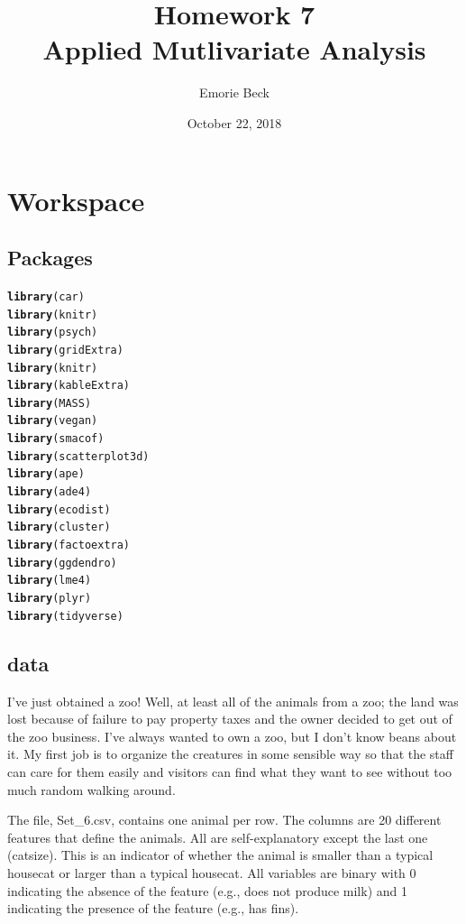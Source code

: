 \documentclass{article}\usepackage[]{graphicx}\usepackage[]{color}
\title{%
Homework 7\\
\large Applied Mutlivariate Analysis}
\date{October 22, 2018}
\author{Emorie Beck}
\makeatletter
\newcommand{\hlstd}[1]{\textcolor[rgb]{0.345,0.345,0.345}{#1}}%
\newcommand{\hlkwd}[1]{\textcolor[rgb]{0.737,0.353,0.396}{\textbf{#1}}}%
\newenvironment{kframe}{%
 \def\at@end@of@kframe{}%
 \ifinner\ifhmode%
  \def\at@end@of@kframe{\end{minipage}}%
  \begin{minipage}{\columnwidth}%
 \fi\fi%
 \def\FrameCommand##1{\hskip\@totalleftmargin \hskip-\fboxsep
 \colorbox{shadecolor}{##1}\hskip-\fboxsep
     \hskip-\linewidth \hskip-\@totalleftmargin \hskip\columnwidth}%
 \MakeFramed {\advance\hsize-\width
   \@totalleftmargin\z@ \linewidth\hsize
   \@setminipage}}%
 {\par\unskip\endMakeFramed%
 \at@end@of@kframe}
\newenvironment{knitrout}{}{} %
\makeatother
\begin{document}
\maketitle

\section{Workspace}
\subsection{Packages}



\begin{knitrout}
\color{fgcolor}\begin{kframe}
\begin{alltt}
\hlkwd{library}\hlstd{(car)}
\hlkwd{library}\hlstd{(knitr)}
\hlkwd{library}\hlstd{(psych)}
\hlkwd{library}\hlstd{(gridExtra)}
\hlkwd{library}\hlstd{(knitr)}
\hlkwd{library}\hlstd{(kableExtra)}
\hlkwd{library}\hlstd{(MASS)}
\hlkwd{library}\hlstd{(vegan)}
\hlkwd{library}\hlstd{(smacof)}
\hlkwd{library}\hlstd{(scatterplot3d)}
\hlkwd{library}\hlstd{(ape)}
\hlkwd{library}\hlstd{(ade4)}
\hlkwd{library}\hlstd{(ecodist)}
\hlkwd{library}\hlstd{(cluster)}
\hlkwd{library}\hlstd{(factoextra)}
\hlkwd{library}\hlstd{(ggdendro)}
\hlkwd{library}\hlstd{(lme4)}
\hlkwd{library}\hlstd{(plyr)}
\hlkwd{library}\hlstd{(tidyverse)}
\end{alltt}
\end{kframe}
\end{knitrout}



\subsection{data}
I’ve just obtained a zoo! Well, at least all of the animals from a zoo; the land was lost because of failure to pay property taxes and the owner decided to get out of the zoo business. I’ve always wanted to own a zoo, but I don’t know beans about it. My first job is to organize the creatures in some sensible way so that the staff can care for them easily and visitors can find what they want to see without too much random walking around.

The file, Set\_6.csv, contains one animal per row. The columns are 20 different features that define the animals. All are self-explanatory except the last one (catsize). This is an indicator of whether the animal is smaller than a typical housecat or larger than a typical housecat. All variables are binary with 0 indicating the absence of the feature (e.g., does not produce milk) and 1 indicating the presence of the feature (e.g., has fins).
\end{document}
